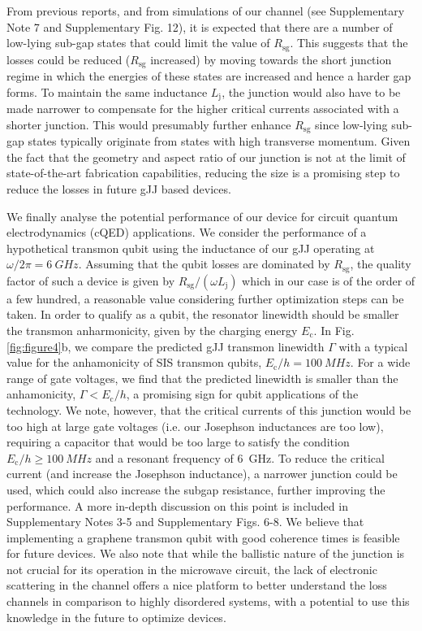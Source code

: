 From previous reports\cite{rosdahlAndreevRectifierNonlocal2018}, and from simulations of our channel (see Supplementary Note 7 and Supplementary Fig. 12), it is expected that there are a number of low-lying sub-gap states that could limit the value of $R_\text{sg}$.
This suggests that the losses could be reduced ($R_\text{sg}$ increased) by moving towards the short junction regime in which the energies of these states are increased and hence a harder gap forms.
To maintain the same inductance $L_\text{j}$, the junction would also have to be made narrower to compensate for the higher critical currents associated with a shorter junction.
This would presumably further enhance $R_\text{sg}$ since low-lying sub-gap states typically originate from states with high transverse momentum.
Given the fact that the geometry and aspect ratio of our junction is not at the limit of state-of-the-art fabrication capabilities, reducing the size is a promising step to reduce the losses in future gJJ based devices.

We finally analyse the potential performance of our device for circuit quantum electrodynamics (cQED) applications.
We consider the performance of a hypothetical transmon qubit \cite{kochChargeinsensitiveQubitDesign2007b} using the inductance of our gJJ operating at $\omega/2\pi=\SI{6}{GHz}$.
Assuming that the qubit losses are dominated by $R_\text{sg}$, the quality factor of such a device is given by $R_\text{sg}/(\omega L_\text{j})$ which in our case is of the order of a few hundred, a reasonable value considering further optimization steps can be taken.
In order to qualify as a qubit, the resonator linewidth should be smaller the transmon anharmonicity, given by the charging energy $E_\text{c}$.
In Fig. \ref{fig:figure4}b, we compare the predicted gJJ transmon linewidth $\Gamma$ with a typical value for the anhamonicity of SIS transmon qubits, $E_\text{c}/h = \SI{100}{MHz}$.
For a wide range of gate voltages, we find that the predicted linewidth is smaller than the anhamonicity, $\Gamma < E_\text{c}/h$, a promising sign for qubit applications of the technology.
We note, however, that the critical currents of this junction would be too high at large gate voltages (i.e. our Josephson inductances are too low), requiring a capacitor that would be too large to satisfy the condition $E_\text{c}/h \geq \SI{100}{MHz}$ and a resonant frequency of \SI{6}{GHz}.
To reduce the critical current (and increase the Josephson inductance), a narrower junction could be used, which could also increase the subgap resistance, further improving the performance.
A more in-depth discussion on this point is included in Supplementary Notes 3-5 and Supplementary Figs. 6-8.
We believe that implementing a graphene transmon qubit with good coherence times is feasible for future devices.
We also note that while the ballistic nature of the junction is not crucial for its operation in the microwave circuit, the lack of electronic scattering in the channel offers a nice platform to better understand the loss channels in comparison to highly disordered systems, with a potential to use this knowledge in the future to optimize devices. 

